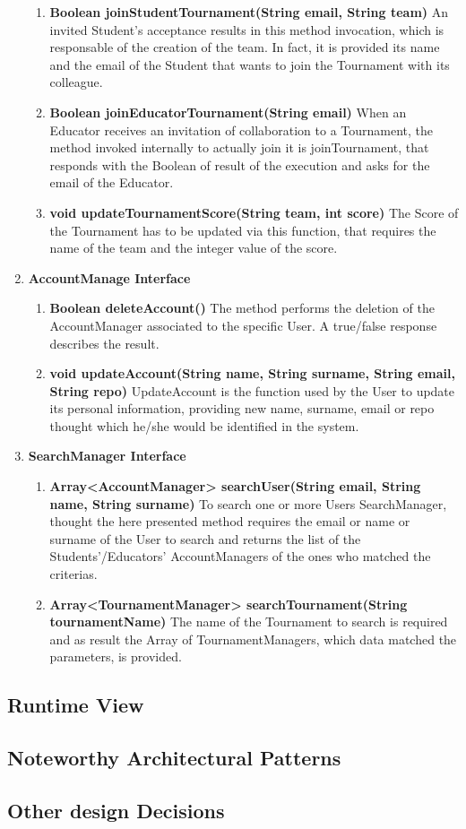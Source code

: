 \begin{enumerate}
\begin{enumerate}[label=$\bullet$]
        \item \textbf{Boolean joinStudentTournament(String email, String team)} An invited Student's acceptance results in this method invocation, which is responsable of the creation of the team. In fact, it is provided its name and the email of the Student that wants to join the Tournament with its colleague.
        \item \textbf{Boolean joinEducatorTournament(String email)} When an Educator receives an invitation of collaboration to a Tournament, the method invoked internally to actually join it is joinTournament, that responds with the Boolean of result of the execution and asks for the email of the Educator.
        \item \textbf{void updateTournamentScore(String team, int score)} The Score of the Tournament has to be updated via this function, that requires the name of the team and the integer value of the score.
        \end{enumerate}
    \item \textbf{AccountManage Interface} 
        \begin{enumerate}[label=$\bullet$]
            \item \textbf{Boolean deleteAccount()} The method performs the deletion of the AccountManager associated to the specific User. A true/false response describes the result.
            \item \textbf{void updateAccount(String name, String surname, String email, String repo)} UpdateAccount is the function used by the User to update its personal information, providing new name, surname, email or repo thought which he/she would be identified in the system.
        \end{enumerate}
    \item \textbf{SearchManager Interface} 
        \begin{enumerate}[label=$\bullet$]
            \item \textbf{Array<AccountManager> searchUser(String email, String name, String surname)} To search one or more Users SearchManager, thought the here presented method requires the email or name or surname of the User to search and returns the list of the Students'/Educators' AccountManagers of the ones who matched the criterias.
            \item \textbf{Array<TournamentManager> searchTournament(String tournamentName)} The name of the Tournament to search is required and as result the Array of TournamentManagers, which data matched the parameters, is provided.
        \end{enumerate}
\end{enumerate}
\subsection{Runtime View}
\subsection{Noteworthy Architectural Patterns}
\subsection{Other design Decisions}